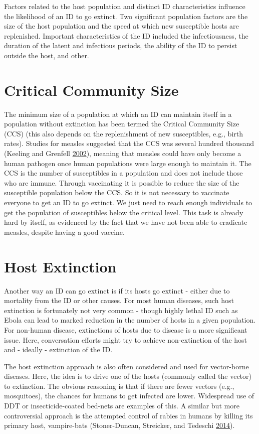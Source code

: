 \documentclass[]{book}
\theoremstyle{definition}
\theoremstyle{definition}
\theoremstyle{definition}
\theoremstyle{remark}
\begin{document}
Factors related to the host population and distinct ID characteristics
influence the likelihood of an ID to go extinct. Two significant
population factors are the size of the host population and the speed at
which new susceptible hosts are replenished. Important characteristics
of the ID included the infectiousness, the duration of the latent and
infectious periods, the ability of the ID to persist outside the host,
and other.

\section{Critical Community Size}\label{critical-community-size}

The minimum size of a population at which an ID can maintain itself in a
population without extinction has been termed the Critical Community
Size (CCS) (this also depends on the replenishment of new susceptibles,
e.g., birth rates). Studies for measles suggested that the CCS was
several hundred thousand (Keeling and Grenfell
\protect\hyperlink{ref-keeling02}{2002}), meaning that measles could
have only become a human pathogen once human populations were large
enough to maintain it. The CCS is the number of susceptibles in a
population and does not include those who are immune. Through
vaccinating it is possible to reduce the size of the susceptible
population below the CCS. So it is not necessary to vaccinate everyone
to get an ID to go extinct. We just need to reach enough individuals to
get the population of susceptibles below the critical level. This task
is already hard by itself, as evidenced by the fact that we have not
been able to eradicate measles, despite having a good vaccine.

\section{Host Extinction}\label{host-extinction}

Another way an ID can go extinct is if its hosts go extinct - either due
to mortality from the ID or other causes. For most human diseases, such
host extinction is fortunately not very common - though highly lethal ID
such as Ebola can lead to marked reduction in the number of hosts in a
given population. For non-human disease, extinctions of hosts due to
disease is a more significant issue. Here, conversation efforts might
try to achieve non-extinction of the host and - ideally - extinction of
the ID.

The host extinction approach is also often considered and used for
vector-borne diseases. Here, the idea is to drive one of the hosts
(commonly called the vector) to extinction. The obvious reasoning is
that if there are fewer vectors (e.g., mosquitoes), the chances for
humans to get infected are lower. Widespread use of DDT or
insecticide-coated bed-nets are examples of this. A similar but more
controversial approach is the attempted control of rabies in humans by
killing its primary host, vampire-bats (Stoner-Duncan, Streicker, and
Tedeschi \protect\hyperlink{ref-stoner-duncan14}{2014}).
\end{document}
